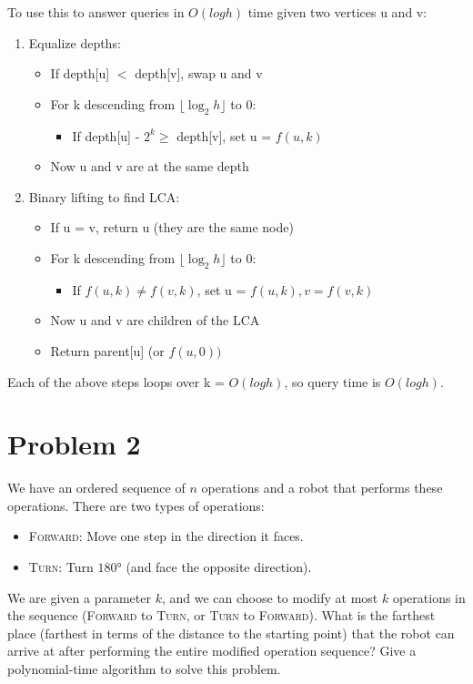 To use this to answer queries in $O(logh)$ time given two vertices u and v: \begin{enumerate} \item Equalize depths: \begin{itemize} \item If depth[u] $<$ depth[v], swap u and v \item For k descending from $\lfloor \log_2 h \rfloor$ to $0$:  \begin{itemize} \item If depth[u] - $2^k \ge$ depth[v], set u = $f(u,k)$ \end{itemize} \item Now u and v are at the same depth \end{itemize} \item Binary lifting to find LCA: \begin{itemize} \item If u = v, return u (they are the same node) \item For k descending from $\lfloor \log_2 h \rfloor$ to $0$: \begin{itemize} \item If $f(u,k) \neq f(v,k)$, set u = $f(u,k), v = f(v,k)$ \end{itemize} \item Now u and v are children of the LCA \item Return parent[u] (or $f(u,0))$ \end{itemize} \end{enumerate}  
Each of the above steps loops over k = $O(logh)$, so query time is $O(logh)$.


\section*{Problem 2}
We have an ordered sequence of $n$ operations and a robot that performs these operations. There are two types of operations:
\begin{itemize}
    \item \textsc{Forward}: Move one step in the direction it faces.
    \item \textsc{Turn}: Turn $\ang{180}$ (and face the opposite direction).
\end{itemize}
We are given a parameter $k$, and we can choose to modify at most $k$ operations in the sequence (\textsc{Forward} to \textsc{Turn}, or \textsc{Turn} to \textsc{Forward}). What is the farthest place (farthest in terms of the distance to the starting point) that the robot can arrive at after performing the entire modified operation sequence? Give a polynomial-time algorithm to solve this problem.

